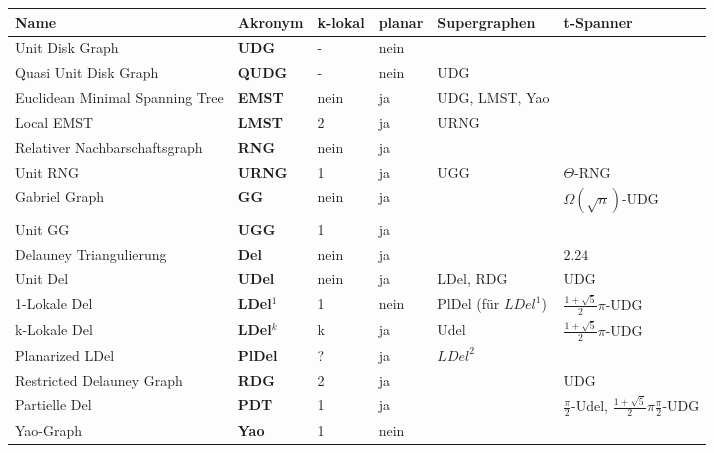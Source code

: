 \documentclass[a4paper,landscape]{article}
\begin{document}
\begin{tabular}{|l|l|l|l|l|l|}\hline
\textbf{Name}                   & \textbf{Akronym}   & \textbf{k-lokal} & \textbf{planar} & \textbf{Supergraphen} & \textbf{t-Spanner}    \\\hline
Unit Disk Graph                 & \textbf{UDG}   & -       & nein   &              &              \\\hline
Quasi Unit Disk Graph           & \textbf{QUDG}  & -       & nein   & UDG          &              \\\hline
Euclidean Minimal Spanning Tree & \textbf{EMST}  & nein    & ja     & UDG, LMST, Yao &              \\\hline
Local EMST                      & \textbf{LMST}  & 2       & ja     & URNG         &              \\\hline
Relativer Nachbarschaftsgraph   & \textbf{RNG}   & nein    & ja     &              &              \\\hline
Unit RNG                        & \textbf{URNG}  & 1       & ja     & UGG          & $\Theta$-RNG \\\hline
Gabriel Graph                   & \textbf{GG}    & nein    & ja     &              & $\Omega(\sqrt{n})$-UDG \\\hline
Unit GG                         & \textbf{UGG}   & 1       & ja     &              &              \\\hline
Delauney Triangulierung         & \textbf{Del}   & nein    & ja     &              & $2.24$       \\\hline
Unit Del                        & \textbf{UDel}  & nein    & ja     & LDel, RDG    & UDG          \\\hline
1-Lokale Del                    & \textbf{LDel$^1$} & 1    & nein   & PlDel (für $LDel^1$) & $\frac{1+\sqrt{5}}{2}\pi$-UDG \\\hline
k-Lokale Del                    & \textbf{LDel$^k$} & k    & ja   & Udel           & $\frac{1+\sqrt{5}}{2}\pi$-UDG \\\hline
Planarized LDel                 & \textbf{PlDel} & ?       & ja     & $LDel^2$     &              \\\hline
Restricted Delauney Graph       & \textbf{RDG}   & 2       & ja     &              & UDG          \\\hline
Partielle Del                   & \textbf{PDT}   & 1       & ja     &              & $\frac{\pi}{2}$-Udel, $\frac{1+\sqrt{5}}{2}\pi\frac{\pi}{2}$-UDG \\\hline
Yao-Graph                       & \textbf{Yao}   & 1       & nein   &              &              \\\hline
\end{tabular}
\end{document}
